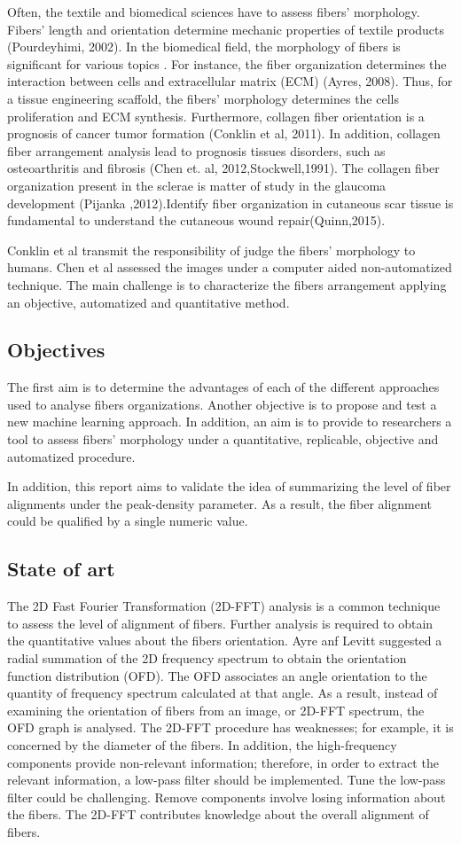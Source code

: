 \documentclass[12pt,a4paper]{article}
\begin{document}
Often, the textile and biomedical sciences have to assess fibers' morphology.  Fibers' length and orientation determine mechanic properties of textile products (Pourdeyhimi, 2002). In the biomedical field, the morphology of fibers is significant for various topics . For instance, the fiber organization determines the interaction between cells and extracellular matrix (ECM) (Ayres, 2008). Thus, for a tissue engineering scaffold, the fibers' morphology determines the cells proliferation and ECM synthesis. Furthermore, collagen fiber orientation is a prognosis of cancer tumor formation (Conklin et al, 2011). In addition, collagen fiber arrangement analysis lead to prognosis tissues disorders, such as osteoarthritis and fibrosis (Chen et. al, 2012,Stockwell,1991). The collagen fiber organization present in the sclerae is matter of study in the glaucoma development (Pijanka ,2012).Identify fiber organization in cutaneous scar tissue is fundamental to understand the cutaneous wound repair(Quinn,2015).

Conklin et al transmit the responsibility of judge the fibers' morphology to humans. Chen et al assessed the images under a computer aided non-automatized technique. The  main challenge is to characterize the fibers arrangement applying an objective, automatized and quantitative method.
\subsection{Objectives}
The first aim is to determine the advantages of each of the different approaches used to analyse fibers organizations. Another objective is to propose and test a new machine learning approach. In addition, an aim is to provide to researchers a tool to assess fibers’ morphology under a quantitative, replicable, objective and automatized procedure.

In addition, this report aims to validate the idea of summarizing the level of fiber alignments under the peak-density parameter. As a result, the fiber alignment could be qualified by a single numeric value.
\subsection{State of art}
The 2D Fast Fourier Transformation (2D-FFT) analysis is a common technique to assess the level of alignment of fibers. Further analysis is required to obtain the quantitative values about the fibers orientation. Ayre anf Levitt suggested a radial summation of the 2D frequency spectrum to obtain the orientation function distribution (OFD). The OFD associates an angle orientation to the quantity of frequency spectrum calculated at that angle. As a result, instead of examining the orientation of fibers from an image, or 2D-FFT spectrum, the OFD graph is analysed. The 2D-FFT procedure has weaknesses; for example, it is concerned by the diameter of the fibers. In addition, the high-frequency components provide non-relevant information; therefore, in order to extract the relevant information, a low-pass filter should be implemented. Tune the low-pass filter could be challenging. Remove components involve losing information about the fibers. The 2D-FFT contributes knowledge about the overall alignment of fibers.
\end{document}
